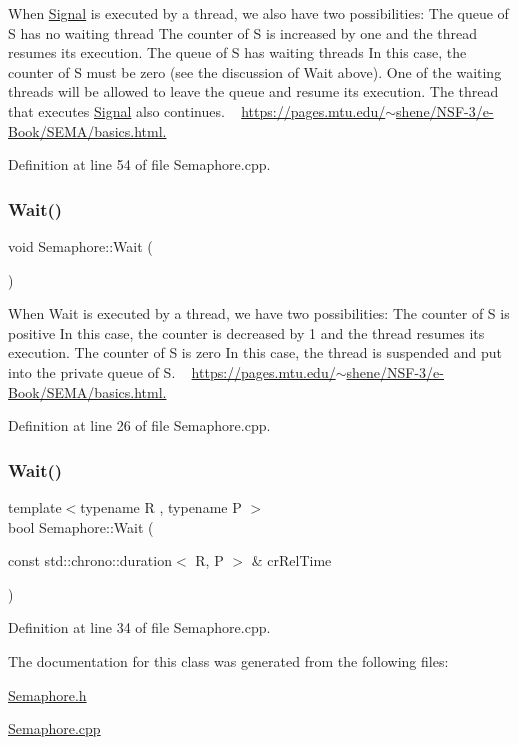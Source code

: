 When \hyperlink{class_signal}{Signal} is executed by a thread, we also have two possibilities\+: The queue of S has no waiting thread The counter of S is increased by one and the thread resumes its execution. The queue of S has waiting threads In this case, the counter of S must be zero (see the discussion of Wait above). One of the waiting threads will be allowed to leave the queue and resume its execution. The thread that executes \hyperlink{class_signal}{Signal} also continues. ~\newline
\hyperlink{}{https\+://pages.\+mtu.\+edu/$\sim$shene/\+N\+S\+F-\/3/e-\/\+Book/\+S\+E\+M\+A/basics.\+html.}



Definition at line 54 of file Semaphore.\+cpp.

\mbox{\label{class_semaphore_a72aabebf026e3a8b1f3e4d0fa8ee1eda}} 
\subsubsection{\texorpdfstring{Wait()}{Wait()}\hspace{0.1cm}{\footnotesize\ttfamily [1/2]}}
{\footnotesize\ttfamily void Semaphore\+::\+Wait (\begin{DoxyParamCaption}{ }\end{DoxyParamCaption})}



When Wait is executed by a thread, we have two possibilities\+: The counter of S is positive In this case, the counter is decreased by 1 and the thread resumes its execution. The counter of S is zero In this case, the thread is suspended and put into the private queue of S. ~\newline
\hyperlink{}{https\+://pages.\+mtu.\+edu/$\sim$shene/\+N\+S\+F-\/3/e-\/\+Book/\+S\+E\+M\+A/basics.\+html.}



Definition at line 26 of file Semaphore.\+cpp.

\mbox{\label{class_semaphore_a7f700173ae86ae623684109066e07656}} 
\subsubsection{\texorpdfstring{Wait()}{Wait()}\hspace{0.1cm}{\footnotesize\ttfamily [2/2]}}
{\footnotesize\ttfamily template$<$typename R , typename P $>$ \\
bool Semaphore\+::\+Wait (\begin{DoxyParamCaption}\item[{const std\+::chrono\+::duration$<$ R, P $>$ \&}]{cr\+Rel\+Time }\end{DoxyParamCaption})}



Definition at line 34 of file Semaphore.\+cpp.



The documentation for this class was generated from the following files\+:\begin{DoxyCompactItemize}
\item 
\hyperlink{_semaphore_8h}{Semaphore.\+h}\item 
\hyperlink{_semaphore_8cpp}{Semaphore.\+cpp}\end{DoxyCompactItemize}
